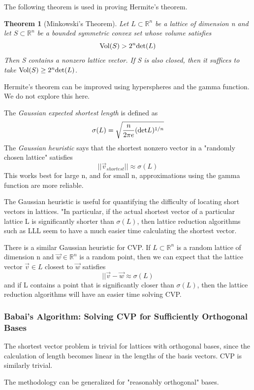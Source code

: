 \documentclass[10pt,a4paper]{article}
\newtheorem*{theorem}{Theorem}
\theoremstyle{remark}
\begin{document}
The following theorem is used in proving Hermite's theorem.
\begin{theorem}[Minkowski's Theorem]
Let $L\subset \mathbb{R}^n$ be a lattice of dimension n and let $S\subset \mathbb{R}^n$ be a bounded symmetric convex set whose volume satisfies
$$\textup{Vol}(S)>2^n\textup{det}(L)$$
Then S contains a nonzero lattice vector. If S is also closed, then it suffices to take $\textup{Vol}(S)\geq 2^n \textup{det}(L)$.
\end{theorem}

Hermite's theorem can be improved using hyperspheres and the gamma function. We do not explore this here.

The \textit{Gaussian expected shortest length} is defined as
$$\sigma(L)=\sqrt{\frac{n}{2\pi e}(\textup{det}L)^{1/n}}$$
The \textit{Gaussian heuristic} says that the shortest nonzero vector in a "randomly chosen lattice" satisfies
$$\vert\vert \vec{v}_{shortest}\vert\vert \approx \sigma(L)$$
This works best for large n, and for small n, approximations using the gamma function are more reliable.

The Gaussian heuristic is useful for quantifying the difficulty of locating short vectors in lattices. "In particular, if the actual shortest vector of a particular lattice L is significantly shorter than $\sigma(L)$, then lattice reduction algorithms such as LLL seem to have a much easier time calculating the shortest vector.

There is a similar Gaussian heuristic for CVP. If $L\subset \mathbb{R}^n$ is a random lattice of dimension n and $\vec{w}\in\mathbb{R}^n$ is a random point, then we can expect that the lattice vector $\vec{v}\in L$ closest to $\vec{w}$ satisfies
$$\vert \vert \vec{v}-\vec{w}\approx \sigma(L)$$
and if L contains a point that is significantly closer than $\sigma(L)$, then the lattice reduction algorithms will have an easier time solving CVP.

\subsubsection{Babai's Algorithm: Solving CVP for Sufficiently Orthogonal Bases}

The shortest vector problem is trivial for lattices with orthogonal bases, since the calculation of length becomes linear in the lengths of the basis vectors. CVP is similarly trivial.

The methodology can be generalized for "reasonably orthogonal" bases.
\end{document}
